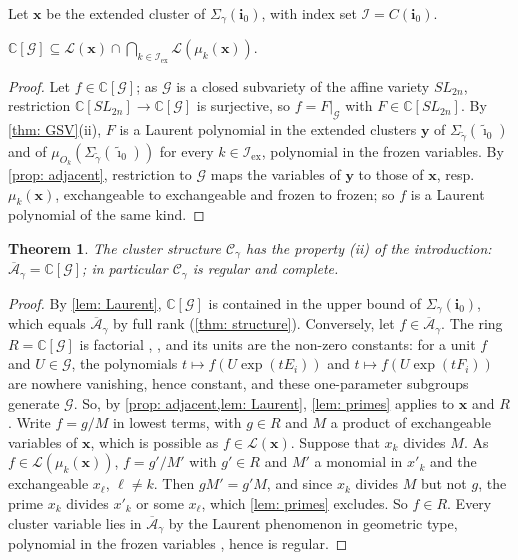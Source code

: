 \documentclass[a4paper]{amsart}
\numberwithin{equation}{section}
\newtheorem{theorem}{Theorem}[section]
\theoremstyle{definition}
\theoremstyle{remark}
\newcommand{\bbC}{\mathbb{C}}
\newcommand{\mcG}{\mathcal{G}}
\newcommand{\mcC}{\mathcal{C}}
\newcommand{\mcL}{\mathcal{L}}
\newcommand{\mcI}{\mathcal{I}}
\newcommand{\oA}{\overline{\mathcal{A}}}
\newcommand{\bfi}{\mathbf{i}}
\newcommand{\tbfi}{\widetilde{\boldsymbol{\imath}}}
\newcommand{\bx}{\mathbf{x}}
\newcommand{\by}{\mathbf{y}}
\newcommand{\tg}{\widetilde{\gamma}}
\newcommand{\ex}{\mathrm{ex}}
\newcommand{\SL}{SL_{2n}}
\begin{document}
Let $\bx$ be the extended cluster of $\Sigma_\gamma(\bfi_0)$, with index set $\mcI=C(\bfi_0)$.

\begin{lemma}
  \label{lem: Laurent}
  $\bbC[\mcG]\subseteq\mcL(\bx)\cap\bigcap_{k\in \mcI_\ex}\mcL(\mu_k(\bx))$.
\end{lemma}
\begin{proof}
  Let $f\in\bbC[\mcG]$; as $\mcG$ is a closed subvariety of the affine variety $\SL$, restriction $\bbC[\SL]\to\bbC[\mcG]$ is surjective, so $f=F|_\mcG$ with $F\in\bbC[\SL]$.
  By \cref{thm: GSV}(ii), $F$ is a Laurent polynomial in the extended clusters $\by$ of $\Sigma_{\tg}(\tbfi_0)$ and of $\mu_{O_k}(\Sigma_{\tg}(\tbfi_0))$ for every $k\in \mcI_\ex$, polynomial in the frozen variables.
  By \cref{prop: adjacent}, restriction to $\mcG$ maps the variables of $\by$ to those of $\bx$, resp.\ $\mu_k(\bx)$, exchangeable to exchangeable and frozen to frozen; so $f$ is a Laurent polynomial of the same kind.
\end{proof}

\begin{theorem}
  \label{thm: complete}
  The cluster structure $\mcC_\gamma$ has the property (ii) of the introduction: $\oA_\gamma=\bbC[\mcG]$; in particular $\mcC_\gamma$ is regular and complete.
\end{theorem}
\begin{proof}
  By \cref{lem: Laurent}, $\bbC[\mcG]$ is contained in the upper bound of $\Sigma_\gamma(\bfi_0)$, which equals $\oA_\gamma$ by full rank (\cref{thm: structure}).
  Conversely, let $f\in\oA_\gamma$.
  The ring $R=\bbC[\mcG]$ is factorial \cite[Proposition~1 and Corollary]{Pop74}, \cite[Theorem~3]{KP83}, and its units are the non-zero constants: for a unit $f$ and $U\in\mcG$, the polynomials $t\mapsto f(U\exp(tE_i))$ and $t\mapsto f(U\exp(tF_i))$ are nowhere vanishing, hence constant, and these one-parameter subgroups generate $\mcG$.
  So, by \cref{prop: adjacent,lem: Laurent}, \cref{lem: primes} applies to $\bx$ and $R$.
  Write $f=g/M$ in lowest terms, with $g\in R$ and $M$ a product of exchangeable variables of $\bx$, which is possible as $f\in\mcL(\bx)$.
  Suppose that $x_k$ divides $M$.
  As $f\in\mcL(\mu_k(\bx))$, $f=g'/M'$ with $g'\in R$ and $M'$ a monomial in $x'_k$ and the exchangeable $x_\ell$, $\ell\neq k$.
  Then $gM'=g'M$, and since $x_k$ divides $M$ but not $g$, the prime $x_k$ divides $x'_k$ or some $x_\ell$, which \cref{lem: primes} excludes.
  So $f\in R$.
  Every cluster variable lies in $\oA_\gamma$ by the Laurent phenomenon in geometric type, polynomial in the frozen variables \cite[Proposition~11.2]{FZ03}, hence is regular.
\end{proof}
\end{document}

